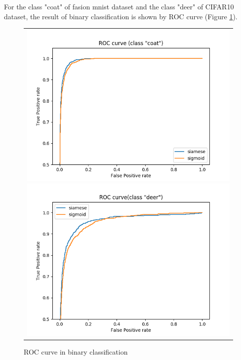 \documentclass[twocolumn,10pt]{article}
\begin{document}
For the class "coat" of fasion mnist dataset and the class "deer" of CIFAR10 dataset, the result of binary classification is shown by ROC curve (Figure \ref{fig:roc-bi}). \par
\begin{figure}[ht] 
\centering
\begin{tabular}{c}
        \begin{minipage}{0.50\hsize}
            \centering
            \includegraphics[scale=0.25]{fasion_roccurve.png}
        \end{minipage}
          \begin{minipage}{0.50\hsize}
            \centering
            \includegraphics[scale=0.25]{roc_curve.png}
        \end{minipage}
\end{tabular}
\caption{ROC curve in binary classification}
\label{fig:roc-bi}
\end{figure}
\end{document}
